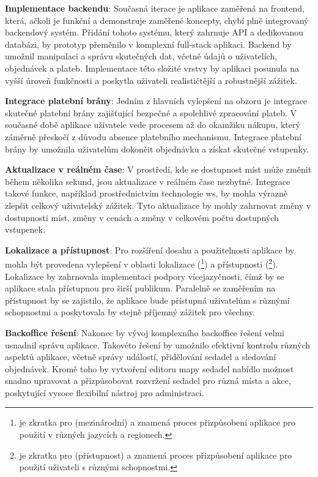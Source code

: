 \textbf{Implementace backendu}: Současná iterace je aplikace zaměřená na frontend, která, ačkoli je funkční a demonstruje zaměřené koncepty, chybí plně integrovaný backendový systém.
Přidání tohoto systému, který zahrnuje API a dedikovanou databázi, by prototyp přeměnilo v komplexní full-stack aplikaci.
Backend by umožnil manipulaci a správu skutečných dat, včetně údajů o uživatelích, objednávek a plateb.
Implementace této složité vrstvy by aplikaci posunula na vyšší úroveň funkčnosti a poskytla uživateli realističtější a robustnější zážitek.

\textbf{Integrace platební brány}: Jedním z hlavních vylepšení na obzoru je integrace skutečné platební brány zajišťující bezpečné a spolehlivé zpracování plateb.
V současné době aplikace uživatele vede procesem až do okamžiku nákupu, který záměrně přeskočí z důvodu absence platebního mechanismu.
Integrace platební brány by umožnila uživatelům dokončit objednávku a získat skutečné vstupenky.

\textbf{Aktualizace v reálném čase}: V prostředí, kde se dostupnost míst může změnit během několika sekund, jsou aktualizace v reálném čase nezbytné.
Integrace takové funkce, například prostřednictvím technologie \acl{ws}, by mohla výrazně zlepšit celkový uživatelský zážitek.
Tyto aktualizace by mohly zahrnovat změny v dostupnosti míst, změny v cenách a změny v celkovém počtu dostupných vstupenek.

\textbf{Lokalizace a přístupnost}: Pro rozšíření dosahu a použitelnosti aplikace by mohla být provedena vylepšení v oblasti lokalizace (\footnote{ je zkratka pro  (mezinárodní) a znamená proces přizpůsobení aplikace pro použití v různých jazycích a regionech.}) a přístupnosti (\footnote{ je zkratka pro  (přístupnost) a znamená proces přizpůsobení aplikace pro použití uživateli s různými schopnostmi.}).
Lokalizace by zahrnovala implementaci podpory vícejazyčnosti, čímž by se aplikace stala přístupnou pro širší publikum.
Paralelně se zaměřením na přístupnost by se zajistilo, že aplikace bude přístupná uživatelům s různými schopnostmi a poskytovala by stejně příjemný zážitek pro všechny.

\textbf{Backoffice řešení}: Nakonec by vývoj komplexního backoffice řešení velmi usnadnil správu aplikace.
Takovéto řešení by umožnilo efektivní kontrolu různých aspektů aplikace, včetně správy událostí, přidělování sedadel a sledování objednávek.
Kromě toho by vytvoření editoru mapy sedadel nabídlo možnost snadno upravovat a přizpůsobovat rozvržení sedadel pro různá místa a akce, poskytující vysoce flexibilní nástroj pro administraci.

